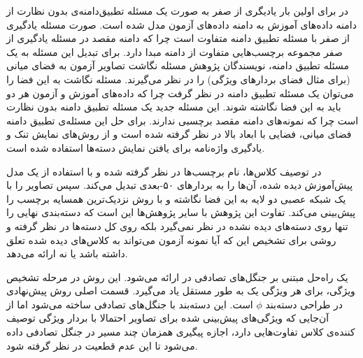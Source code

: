 در \cite{ Kodirov2015} برای اولین بار یادیگری از صفر به صورت یک مسئله تطبیق‌دامنه‌ی بدون نظارت از دامنه داده‌های آموزش به دامنه داده‌های آزمون مدل شده است. صورت مسئله یادگیری از صفر با مسئله تطبیق دامنه متفاوت است چرا که دامنه مقصد در مسئله یادگیری از صفر مجموعه برچسب‌هایی متفاوت از دامنه مبدا دارد. برای تبدیل این مسئله به یک مسئله تطبیق دامنه، نویسندگان پژوهش مسئله نگاشت تصاویر آزمون به فضای میانی (برای مثال فضای بردارهای ویژگی) را در نظر می‌گیرند. مسئله نگاشت به این فضا را می‌توان یک مسئله تطبیق دامنه در نظر گرفت چرا که داده‌های آموزش و آزمون هر دو باید به این فضا نگاشته شوند. این مسئله جدید یک مسئله تطبیق دامنه بدون نظارت است چرا که نمونه‌های دامنه مقصد برچسبی ندارند. برای حل این مسئله‌ی تطبیق دامنه فضای میانی، فضایی با ابعاد بالا در نظر گرفته شده است و از روش‌های نمایش تنک 
و یادگیری واژه‌نامه برای یافتن نمایش دسته‌ها استفاده شده است. 
 
 
در \cite{ ng13} توصیف کلاس‌ها، نام برچسب‌ها در نظر گرفته شده و با استفاده از یک مدل پیش‌آموزش دیده شده، آن‌ها را به بردارهای ۵۰-بعدی تبدیل می‌کند. سپس تصاویر را با یک شبکه عصبی دو لایه به این فضا نگاشته و با روش نزدیک‌ترین همسایه برچسب را پیش‌بینی می‌کند. تفاوت این پژوهش با سایر پژوهش‌ها این است که دسته‌بندی نهایی را تنها روی دسته‌های دیده نشده در نظر نمی‌گیرد بلکه روی کل دسته‌ها در نظر گرفته و روشی برای تشخیص این که آیا نمونه آزمون می‌تواند به کلاس‌های دیده شده تعلق داشته باشد یا نه ارائه می‌دهد.

یک راه‌حل مبتنی بر جنگل‌های تصادفی  در \cite{ jayaraman14} ارائه می‌شود. این روش در مرحله تشخیص ویژگی، برای هر ویژگی یک   به طور مستقل یاد می‌گیرد. قسمت اصلی روش پیش‌نهادی در طراحی دسته‌بند $\phi$ است. این دسته‌بند با جنگل‌های تصادفی ساخته می‌شود اما از آن‌جایی که ویژگی‌های پیش‌بینی شده برای تصاویر احتمالا با بردار ویژگی توصیف کننده‌ی کلاس تفاوت‌هایی دارد، اجازه پیگیری همزمان چند مسیر در جنگل تصادفی داده می‌شود تا این عدم قطعیت در نظر گرفته شود. 




 

